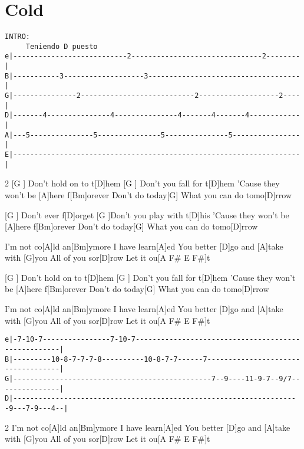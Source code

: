 \section{Cold}
\begin{guitar}
\begin{texttt}
\begin{verbatim}
INTRO:
     Teniendo D puesto
e|---------------------------2-------------------------------2--------|
B|-----------3-------------------3------------------------------------|
G|---------------2---------------------------2-------------------2----|
D|-------4---------------4---------------4-------4-------4------------|
A|---5---------------5---------------5---------------5----------------|
E|--------------------------------------------------------------------|
\end{verbatim}
\end{texttt}
\begin{multicols}{2}
[G  ]{} Don't hold on to t[D]hem
[G  ]{}  Don't you fall for t[D]hem
'Cause they won't be [A]here \hspace{0.5cm} f[Bm]orever
Don't do today[G]{}
What you can do tomo[D]rrow


[G  ]{} Don't ever f[D]orget
[G  ]{}Don't you play with t[D]his
'Cause they won't be [A]here \hspace{0.5cm} f[Bm]orever
Don't do today[G]{}
What you can do tomo[D]rrow


I'm not co[A]ld an[Bm]ymore
I have learn[A]ed
You better [D]go and [A]take with [G]you
All of you sor[D]row
Let it ou[A    F#   E   F#]t


[G  ]{} Don't hold on to t[D]hem
[G  ]{}  Don't you fall for t[D]hem
'Cause they won't be [A]here \hspace{0.5cm}  f[Bm]orever
Don't do today[G]{}
What you can do tomo[D]rrow
 

I'm not co[A]ld an[Bm]ymore
I have learn[A]ed
You better [D]go and [A]take with [G]you
All of you sor[D]row
Let it ou[A  F#  E  F#]{}t
\end{multicols}
\begin{texttt}
\begin{verbatim}
e|-7-10-7----------------7-10-7----------------------------------------------------|
B|---------10-8-7-7-7-8----------10-8-7-7------7-----------------------------------|
G|-----------------------------------------------7--9----11-9-7--9/7---------------|
D|--------------------------------------------------------------------9---7-9---4--|
\end{verbatim}
\end{texttt}
\begin{multicols}{2}
I'm not co[A]ld an[Bm]ymore
I have learn[A]ed
You better [D]go and [A]take with [G]you
All of you sor[D]row
Let it ou[A  F#  E  F#]{}t



\end{multicols}
\end{guitar}
